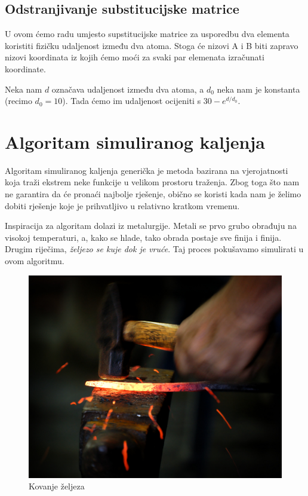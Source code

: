 \documentclass[times, utf8, zavrsni]{fer}
\begin{document}
\section{Odstranjivanje substitucijske matrice}

U ovom ćemo radu umjesto supstitucijske matrice za usporedbu dva elementa
koristiti fizičku udaljenost između dva atoma. Stoga će nizovi A i B biti
zapravo nizovi koordinata iz kojih ćemo moći za svaki par elemenata
izračunati koordinate. 

Neka nam $d$ označava udaljenost između dva atoma, a $d_0$ neka nam
je konstanta (recimo $d_0 = 10$). Tada ćemo im udaljenost ocijeniti s
$30-e^{d/d_0}$. 


\chapter{Algoritam simuliranog kaljenja}
Algoritam simuliranog kaljenja generička je metoda bazirana na vjerojatnosti koja
traži ekstrem neke funkcije u velikom prostoru traženja. Zbog toga što nam ne
garantira da će pronaći najbolje rješenje, obično se koristi kada nam je
želimo dobiti rješenje koje je prihvatljivo u relativno kratkom
vremenu.

Inspiracija za algoritam dolazi iz metalurgije. Metali se prvo grubo obrađuju
na visokoj temperaturi, a, kako se hlade, tako obrada postaje sve finija
i  finija. Drugim riječima, \textit{željezo se kuje dok je vruće}. 
Taj proces pokušavamo simulirati u ovom algoritmu.

\begin{figure}[h]
\centering
\includegraphics{res/Kovanje_zeljeza_l.jpg}
\caption[Kovanje željeza]{Kovanje željeza}
\label{figure:kovanje}
\end{figure}
\end{document}
